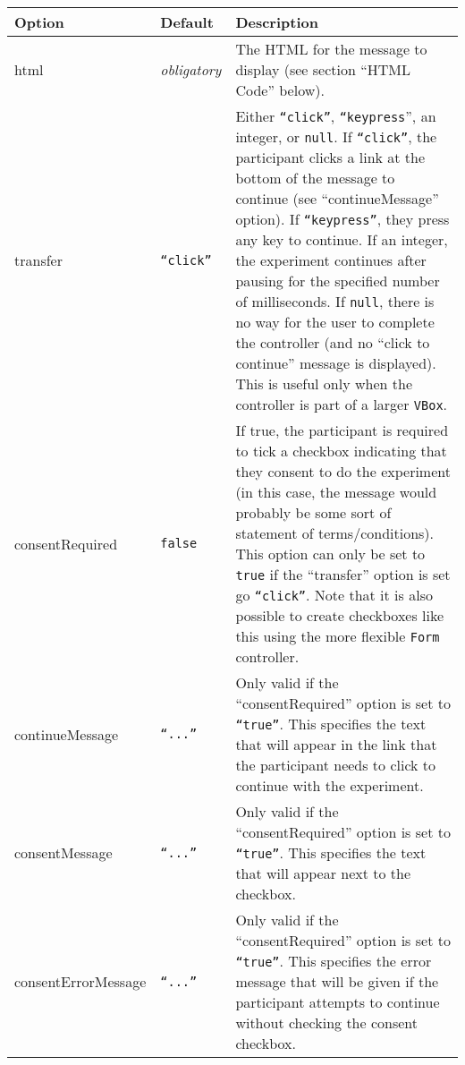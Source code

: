 \documentclass[11pt,letterpaper]{article}
\begin{document}
\footnotesize
\begin{RaggedRight}
\sloppy
\begin{tabular}{|p{1.0228in}|p{1.0078in}|p{3.4694in}|}
\hline
 \textbf{Option}             &  \textbf{Default}     &  \textbf{Description}                                                        \\
\hline
 html                 & \textit{ obligatory}   &  The HTML for the message to display (see section ``HTML Code'' below). \\
\hline
 transfer             &  \texttt{``click''}     &  Either \texttt{``click''}, \texttt{``keypress}'', an integer, or \texttt{null}. If \texttt{``click''}, the participant clicks a link at the bottom of the message to continue (see ``continueMessage'' option). If \texttt{``keypress''}, they press any key to continue. If an integer, the experiment continues after pausing for the specified number of milliseconds. If \texttt{null}, there is no way for the user to complete the controller (and no ``click to continue'' message is displayed). This is useful only when the controller is part of a larger \texttt{VBox}. \\
\hline
 consentRequired      &  \texttt{false}       &  If true, the participant is required to tick a checkbox indicating that they consent to do the experiment (in this case, the message would probably be some sort of statement of terms/conditions). This option can only be set to \texttt{true} if the ``transfer'' option is set go \texttt{``click''}. Note that it is also possible to create checkboxes like this using the more flexible \texttt{Form} controller. \\
\hline
 continueMessage      &  \texttt{``...''}       &  Only valid if the ``consentRequired'' option is set to \texttt{``true''}. This specifies the text that will appear in the link that the participant needs to click to continue with the experiment. \\
\hline
 consentMessage       &  \texttt{``...''}       &  Only valid if the ``consentRequired'' option is set to \texttt{``true''}. This specifies the text that will appear next to the checkbox. \\
\hline
 consentErrorMessage  &  \texttt{``...''}       &  Only valid if the ``consentRequired'' option is set to \texttt{``true''}. This specifies the error message that will be given if the participant attempts to continue without checking the consent checkbox. 
\\\hline
\end{tabular}
\end{RaggedRight}
\fussy
\end{document}
